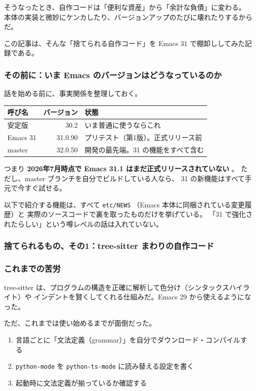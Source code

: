 \documentclass[11pt]{article}
\begin{document}
そうなったとき、自作コードは「便利な資産」から「余計な負債」に変わる。
本体の実装と微妙にケンカしたり、バージョンアップのたびに壊れたりするからだ。

この記事は、そんな「捨てられる自作コード」を Emacs 31 で棚卸ししてみた記録である。
\subsubsection{その前に：いま Emacs のバージョンはどうなっているのか}
\label{sec:org5e52622}

話を始める前に、事実関係を整理しておく。

\begin{center}
\begin{tabular}{lrl}
呼び名 & バージョン & 状態\\
\hline
安定版 & 30.2 & いま普通に使うならこれ\\
Emacs 31 & 31.0.90 & プリテスト（第1版）。正式リリース前\\
master & 32.0.50 & 開発の最先端。31 の機能をすべて含む\\
\end{tabular}
\end{center}

つまり \textbf{2026年7月時点で Emacs 31.1 はまだ正式リリースされていない} 。
ただし、master ブランチを自分でビルドしている人なら、
31 の新機能はすべて手元で今すぐ試せる。

以下で紹介する機能は、すべて \texttt{etc/NEWS} （Emacs 本体に同梱されている変更履歴）と
実際のソースコードで裏を取ったものだけを挙げている。
「31 で強化されたらしい」という噂レベルの話は入れていない。
\subsubsection{捨てられるもの、その1：tree-sitter まわりの自作コード}
\label{sec:orgce1dca2}

\subsubsection{これまでの苦労}
\label{sec:org5a24a26}

tree-sitter は、プログラムの構造を正確に解析して色分け（シンタックスハイライト）や
インデントを賢くしてくれる仕組みだ。Emacs 29 から使えるようになった。

ただ、これまでは使い始めるまでが面倒だった。

\begin{enumerate}
\item 言語ごとに「文法定義（grammar）」を自分でダウンロード・コンパイルする
\item \texttt{python-mode} を \texttt{python-ts-mode} に読み替える設定を書く
\item 起動時に文法定義が揃っているか確認する
\end{enumerate}
\end{document}
